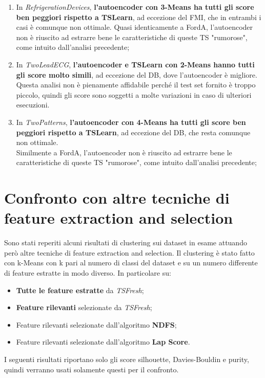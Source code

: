 \begin{enumerate}
	\item In \textit{RefrigerationDevices}, \textbf{l'autoencoder con 3-Means ha tutti gli score ben peggiori rispetto a TSLearn}, ad eccezione del FMI, che in entrambi i casi è comunque non ottimale.
	Quasi identicamente a FordA, l'autoencoder non è riuscito ad estrarre bene le caratteristiche di queste TS "rumorose", come intuito dall'analisi precedente;

	\item In \textit{TwoLeadECG}, \textbf{l'autoencoder e TSLearn con 2-Means hanno tutti gli score molto simili}, ad eccezione del DB, dove l'autoencoder è migliore.
	Questa analisi non è pienamente affidabile perché il test set fornito è troppo piccolo, quindi gli score sono soggetti a molte variazioni in caso di ulteriori esecuzioni.

	\item In \textit{TwoPatterns}, \textbf{l'autoencoder con 4-Means ha tutti gli score ben peggiori rispetto a TSLearn}, ad eccezione del DB, che resta comunque non ottimale.\\
	Similmente a FordA, l'autoencoder non è riuscito ad estrarre bene le caratteristiche di queste TS "rumorose", come intuito dall'analisi precedente;
\end{enumerate}

\section{Confronto con altre tecniche di feature extraction and selection}\label{sec:tsf}
Sono stati reperiti alcuni risultati di clustering sui dataset in esame attuando però altre tecniche di feature extraction and selection. Il clustering è stato fatto con k-Means con k pari al numero di classi del dataset e su un numero differente di feature estratte in modo diverso. 
In particolare su:
\begin{itemize}
	\item \textbf{Tutte le feature estratte} da \textit{TSFresh};
	\item \textbf{Feature rilevanti} selezionate da \textit{TSFresh};
	\item Feature rilevanti selezionate dall'algoritmo \textbf{NDFS};
	\item Feature rilevanti selezionate dall'algoritmo \textbf{Lap Score}.
\end{itemize}
I seguenti risultati riportano solo gli score silhouette, Davies-Bouldin e purity, quindi verranno usati solamente questi per il confronto.

